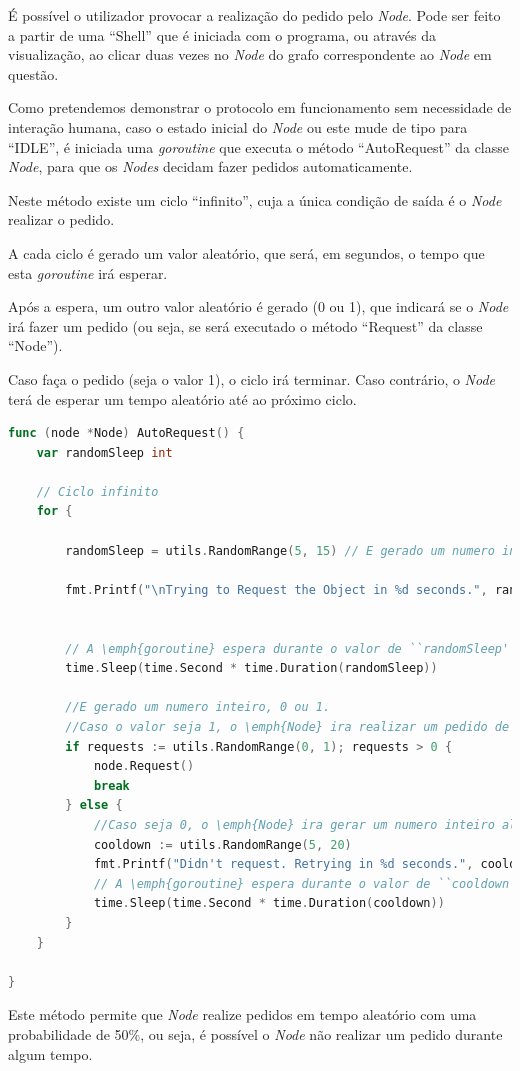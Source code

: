 É possível o utilizador provocar a realização do pedido pelo \emph{Node}. Pode ser feito a partir de uma 
``Shell'' que é iniciada com o programa,
ou através da visualização, ao clicar duas vezes no \emph{Node} do grafo correspondente ao \emph{Node} em questão.

Como pretendemos demonstrar o protocolo em funcionamento sem necessidade de interação humana,
caso o estado inicial do \emph{Node}
ou este mude de tipo para ``IDLE'', 
é iniciada uma \emph{goroutine} que executa o método ``AutoRequest'' da classe \emph{Node}, 
para que os \emph{Nodes} decidam fazer pedidos automaticamente.

Neste método existe um ciclo ``infinito'', cuja a única condição de saída é o \emph{Node} realizar o pedido.

A cada ciclo é gerado um valor aleatório, que será, em segundos, o tempo que esta \emph{goroutine} irá esperar.

Após a espera, um outro valor aleatório é gerado (0 ou 1),
que indicará se o \emph{Node} irá fazer um pedido (ou seja, se será executado o método ``Request'' da classe ``Node'').


Caso faça o pedido (seja o valor 1), o ciclo irá terminar.
Caso contrário, o \emph{Node} terá de esperar um tempo aleatório até ao próximo ciclo.

\begin{lstlisting}[caption={Método ``AutoRequest''},language=Go]
func (node *Node) AutoRequest() {
	var randomSleep int

	// Ciclo infinito
	for {

		randomSleep = utils.RandomRange(5, 15) // E gerado um numero inteiro aleatorio entre 5 e 15

		fmt.Printf("\nTrying to Request the Object in %d seconds.", randomSleep)


		// A \emph{goroutine} espera durante o valor de ``randomSleep'' (em segundos)
		time.Sleep(time.Second * time.Duration(randomSleep))

		//E gerado um numero inteiro, 0 ou 1.
		//Caso o valor seja 1, o \emph{Node} ira realizar um pedido de acesso e o ciclo termina
		if requests := utils.RandomRange(0, 1); requests > 0 {
			node.Request()
			break
		} else {
			//Caso seja 0, o \emph{Node} ira gerar um numero inteiro aleatorio entre 5 e 20
			cooldown := utils.RandomRange(5, 20)
			fmt.Printf("Didn't request. Retrying in %d seconds.", cooldown)
			// A \emph{goroutine} espera durante o valor de ``cooldown'' (em segundos)
			time.Sleep(time.Second * time.Duration(cooldown))
		}
	}

}
\end{lstlisting}
Este método permite que \emph{Node} realize pedidos em tempo aleatório com uma probabilidade de 50\%,
ou seja, é possível o \emph{Node} não realizar um pedido durante algum tempo.



